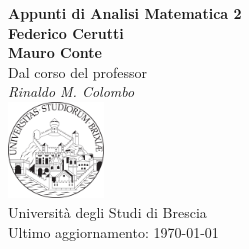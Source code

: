 \documentclass[a4paper,twoside,italian]{book}
\begin{document}
\pagestyle{headings}

\frontmatter
\begin{titlepage}
  \begin{center}
    {\huge\bfseries Appunti di Analisi Matematica 2\\}
    \vspace{1.5cm}
    {\Large\bfseries Federico Cerutti\\Mauro Conte\\}
    \vspace{2cm}
    {Dal corso del professor}\\[5pt]
    \emph{{Rinaldo M. Colombo}}\\[2cm]
    \vfill
    \includegraphics[width=0.19\textwidth]{unibs-logo.png}\\[5pt]
    {Università degli Studi di Brescia}\\[10pt]
    {Ultimo aggiornamento: \today}
  \end{center}
\end{titlepage}

\null\vfill
\doclicenseThis

\newpage
{}
\tableofcontents


\mainmatter








\backmatter
\end{document}

